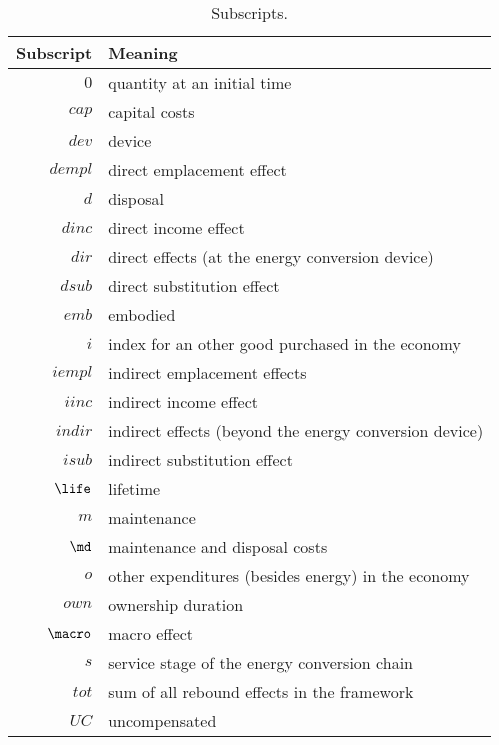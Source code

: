 \begin{table}
\centering
\caption{Subscripts.}
\begin{tabular}{r l}
  \toprule
  Subscript & Meaning \\
  \midrule
  $0$ & quantity at an initial time \\
  $cap$ & capital costs \\
  $dev$ & device \\
  $dempl$ & direct emplacement effect \\
  $d$ & disposal \\
  $dinc$ & direct income effect \\
  $dir$ & direct effects (at the energy conversion device) \\
  $dsub$ & direct substitution effect \\
  $emb$ & embodied \\
  $i$ & index for an other good purchased in the economy \\
  $iempl$ & indirect emplacement effects \\
  $iinc$ & indirect income effect \\
  $indir$ & indirect effects (beyond the energy conversion device) \\
  $isub$ & indirect substitution effect \\
  $\life$ & lifetime \\
  $m$ & maintenance \\
  $\md$ & maintenance and disposal costs \\
  $o$ & other expenditures (besides energy) in the economy \\
  $own$ & ownership duration \\
  $\macro$ & macro effect \\
  $s$ & service stage of the energy conversion chain \\
  $tot$ & sum of all rebound effects in the framework \\
  $UC$ & uncompensated \\
  \bottomrule
\end{tabular}
\label{tab:subscripts}
\end{table}


